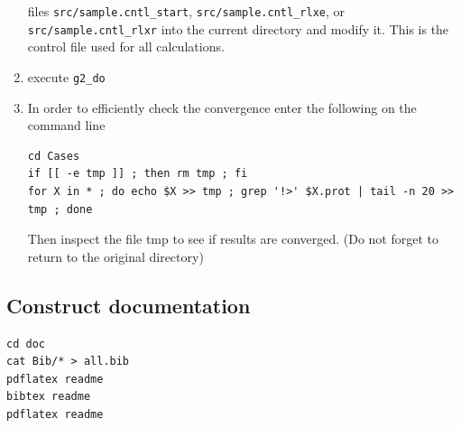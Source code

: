 \documentclass{book}
\begin{document}
\begin{enumerate}
  files \verb|src/sample.cntl_start|, \verb|src/sample.cntl_rlxe|, or
  \verb|src/sample.cntl_rlxr| into the current directory and modify
  it. This is the control file used for all calculations.
%
\item execute \verb|g2_do|
%
\item In order to efficiently check the convergence enter the
  following on the command line
\begin{verbatim}
cd Cases
if [[ -e tmp ]] ; then rm tmp ; fi
for X in * ; do echo $X >> tmp ; grep '!>' $X.prot | tail -n 20 >> tmp ; done
\end{verbatim}
Then inspect the file tmp to see if results are converged. (Do not
forget to return to the original directory)
%
\end{enumerate}

\subsection*{Construct documentation}

\begin{verbatim}
cd doc
cat Bib/* > all.bib
pdflatex readme
bibtex readme
pdflatex readme
\end{verbatim}


\end{document}
